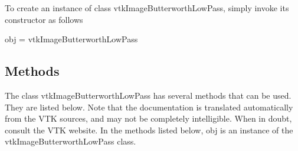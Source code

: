 To create an instance of class vtk\-Image\-Butterworth\-Low\-Pass, simply invoke its constructor as follows \begin{DoxyVerb}  obj = vtkImageButterworthLowPass
\end{DoxyVerb}
 \hypertarget{vtkwidgets_vtkxyplotwidget_Methods}{}\subsection{Methods}\label{vtkwidgets_vtkxyplotwidget_Methods}
The class vtk\-Image\-Butterworth\-Low\-Pass has several methods that can be used. They are listed below. Note that the documentation is translated automatically from the V\-T\-K sources, and may not be completely intelligible. When in doubt, consult the V\-T\-K website. In the methods listed below, {\ttfamily obj} is an instance of the vtk\-Image\-Butterworth\-Low\-Pass class. 
